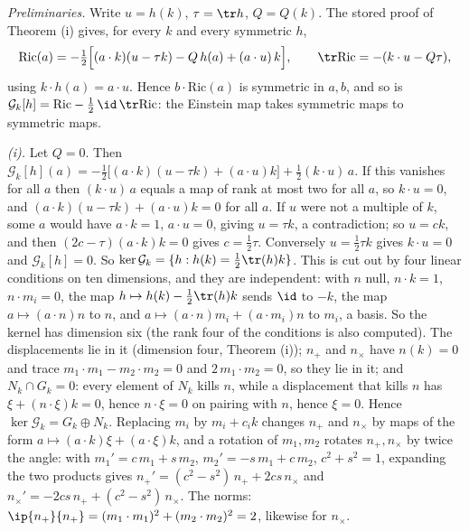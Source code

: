 \emph{Preliminaries.} Write $u = h(k)$, $\tau = \tr h$, $Q = Q(k)$. The stored proof of Theorem (i) gives, for every $k$ and every symmetric $h$,
\[
\mathrm{Ric}(a) = -\tfrac12\Bigl[(a \cdot k)(u - \tau k) - Q\,h(a) + (a \cdot u)\,k\Bigr], \qquad \tr\mathrm{Ric} = -(k \cdot u - Q\tau),
\]
using $k \cdot h(a) = a \cdot u$. Hence $b \cdot \mathrm{Ric}(a)$ is symmetric in $a, b$, and so is $\mathcal{G}_{k}[h] = \mathrm{Ric} - \tfrac12\,\id\,\tr\mathrm{Ric}$: the Einstein map takes symmetric maps to symmetric maps.

\emph{(i).} Let $Q = 0$. Then $\mathcal{G}_{k}[h](a) = -\tfrac12\bigl[(a \cdot k)(u - \tau k) + (a \cdot u)k\bigr] + \tfrac12 (k \cdot u)\,a$. If this vanishes for all $a$ then $(k \cdot u)\,a$ equals a map of rank at most two for all $a$, so $k \cdot u = 0$, and $(a \cdot k)(u - \tau k) + (a \cdot u)k = 0$ for all $a$. If $u$ were not a multiple of $k$, some $a$ would have $a \cdot k = 1$, $a \cdot u = 0$, giving $u = \tau k$, a contradiction; so $u = ck$, and then $(2c - \tau)(a \cdot k)k = 0$ gives $c = \tfrac12\tau$. Conversely $u = \tfrac12\tau k$ gives $k \cdot u = 0$ and $\mathcal{G}_{k}[h] = 0$. So $\ker\mathcal{G}_{k} = \{h : h(k) = \tfrac12\tr(h)k\}$. This is cut out by four linear conditions on ten dimensions, and they are independent: with $n$ null, $n \cdot k = 1$, $n \cdot m_{i} = 0$, the map $h \mapsto h(k) - \tfrac12\tr(h)k$ sends $\id$ to $-k$, the map $a \mapsto (a \cdot n)n$ to $n$, and $a \mapsto (a \cdot n)m_{i} + (a \cdot m_{i})n$ to $m_{i}$, a basis. So the kernel has dimension six (the rank four of the conditions is also computed). The displacements lie in it (dimension four, Theorem (i)); $n_{+}$ and $n_{\times}$ have $n(k) = 0$ and trace $m_{1} \cdot m_{1} - m_{2} \cdot m_{2} = 0$ and $2\,m_{1} \cdot m_{2} = 0$, so they lie in it; and $N_{k} \cap G_{k} = 0$: every element of $N_{k}$ kills $n$, while a displacement that kills $n$ has $\xi + (n \cdot \xi)k = 0$, hence $n \cdot \xi = 0$ on pairing with $n$, hence $\xi = 0$. Hence $\ker\mathcal{G}_{k} = G_{k} \oplus N_{k}$. Replacing $m_{i}$ by $m_{i} + c_{i}k$ changes $n_{+}$ and $n_{\times}$ by maps of the form $a \mapsto (a \cdot k)\xi + (a \cdot \xi)k$, and a rotation of $m_{1}, m_{2}$ rotates $n_{+}, n_{\times}$ by twice the angle: with $m_{1}' = c\,m_{1} + s\,m_{2}$, $m_{2}' = -s\,m_{1} + c\,m_{2}$, $c^{2} + s^{2} = 1$, expanding the two products gives $n_{+}' = (c^{2} - s^{2})\,n_{+} + 2cs\,n_{\times}$ and $n_{\times}' = -2cs\,n_{+} + (c^{2} - s^{2})\,n_{\times}$. The norms: $\ip{n_{+}}{n_{+}} = (m_{1} \cdot m_{1})^{2} + (m_{2} \cdot m_{2})^{2} = 2$, likewise for $n_{\times}$.

